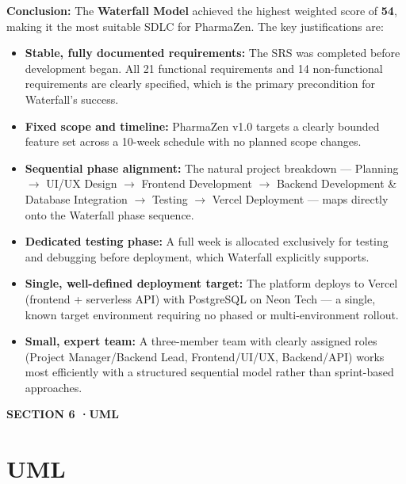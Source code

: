 \documentclass[12pt, a4paper]{article}
\newcommand{\sectionbadge}[2]{%
  \vspace{12pt}\noindent
  \colorbox{pharmagreen}{%
    \parbox{\dimexpr\textwidth-2\fboxsep\relax}{%
      \vspace{4pt}
      \color{white}\small\bfseries\MakeUppercase{Section #1 \quad·\quad #2}
      \vspace{4pt}
    }%
  }\vspace{6pt}
}
\begin{document}
\vspace{12pt}
\noindent\textbf{Conclusion:} The \textbf{Waterfall Model} achieved the highest weighted score of \textbf{54}, making it the most suitable SDLC for PharmaZen. The key justifications are:

\begin{itemize}[leftmargin=1.5em, itemsep=5pt]
  \item \textbf{Stable, fully documented requirements:} The SRS was completed before development began. All 21 functional requirements and 14 non-functional requirements are clearly specified, which is the primary precondition for Waterfall's success.
  \item \textbf{Fixed scope and timeline:} PharmaZen v1.0 targets a clearly bounded feature set across a 10-week schedule with no planned scope changes.
  \item \textbf{Sequential phase alignment:} The natural project breakdown — Planning $\rightarrow$ UI/UX Design $\rightarrow$ Frontend Development $\rightarrow$ Backend Development \& Database Integration $\rightarrow$ Testing $\rightarrow$ Vercel Deployment — maps directly onto the Waterfall phase sequence.
  \item \textbf{Dedicated testing phase:} A full week is allocated exclusively for testing and debugging before deployment, which Waterfall explicitly supports.
  \item \textbf{Single, well-defined deployment target:} The platform deploys to Vercel (frontend + serverless API) with PostgreSQL on Neon Tech — a single, known target environment requiring no phased or multi-environment rollout.
  \item \textbf{Small, expert team:} A three-member team with clearly assigned roles (Project Manager/Backend Lead, Frontend/UI/UX, Backend/API) works most efficiently with a structured sequential model rather than sprint-based approaches.
\end{itemize}

\newpage
\sectionbadge{6}{UML}
\section{UML}
\end{document}
